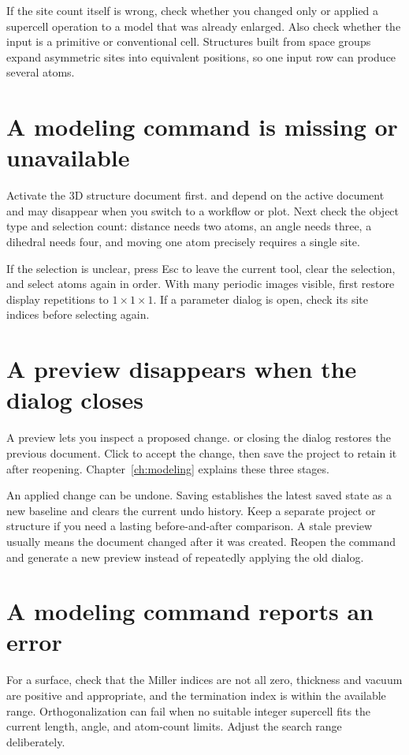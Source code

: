 If the site count itself is wrong, check whether you changed only  or applied a supercell operation to a model that was already enlarged. Also check whether the input is a primitive or conventional cell. Structures built from space groups expand asymmetric sites into equivalent positions, so one input row can produce several atoms.

\section{A modeling command is missing or unavailable}

Activate the 3D structure document first.  and  depend on the active document and may disappear when you switch to a workflow or plot. Next check the object type and selection count: distance needs two atoms, an angle needs three, a dihedral needs four, and moving one atom precisely requires a single site.

If the selection is unclear, press Esc to leave the current tool, clear the selection, and select atoms again in order. With many periodic images visible, first restore display repetitions to $1\times1\times1$. If a parameter dialog is open, check its site indices before selecting again.

\section{A preview disappears when the dialog closes}

A preview lets you inspect a proposed change.  or closing the dialog restores the previous document. Click  to accept the change, then save the project to retain it after reopening. Chapter~\ref{ch:modeling} explains these three stages.

An applied change can be undone. Saving establishes the latest saved state as a new baseline and clears the current undo history. Keep a separate project or structure if you need a lasting before-and-after comparison. A stale preview usually means the document changed after it was created. Reopen the command and generate a new preview instead of repeatedly applying the old dialog.

\section{A modeling command reports an error}

For a surface, check that the Miller indices are not all zero, thickness and vacuum are positive and appropriate, and the termination index is within the available range. Orthogonalization can fail when no suitable integer supercell fits the current length, angle, and atom-count limits. Adjust the search range deliberately.


